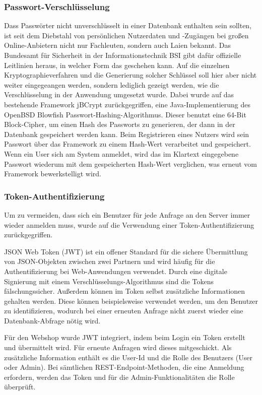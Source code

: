 \subsubsection{Passwort-Verschlüsselung}
Dass Passwörter nicht unverschlüsselt in einer Datenbank enthalten sein sollten, ist seit dem Diebstahl von persönlichen Nutzerdaten und -Zugängen bei großen Online-Anbietern nicht nur Fachleuten, sondern auch Laien bekannt.
Das Bundesamt für Sicherheit in der Informationstechnik \acs{BSI} gibt dafür offizielle Leitlinien heraus, in welcher Form das geschehen kann. \cite{BSI2016}
Auf die einzelnen Kryptographieverfahren und die Generierung solcher Schlüssel soll hier aber nicht weiter eingegeangen werden, sondern lediglich gezeigt werden, wie die Verschlüsselung in der Anwendung umgesetzt wurde.
Dabei wurde auf das bestehende Framework jBCrypt zurückgegriffen, eine Java-Implementierung des OpenBSD Blowfish Passwort-Hashing-Algorithmus. \cite{jBCrypt2015}
Dieser benutzt eine 64-Bit Block-Cipher, um einen Hash des Passworts zu generieren, der dann in der Datenbank gespeichert werden kann. \cite{Provos}
Beim Registrieren eines Nutzers wird sein Passwort über das Framework zu einem Hash-Wert verarbeitet und gespeichert.
Wenn ein User sich am System anmeldet, wird das im Klartext eingegebene Passwort wiederum mit dem gespeicherten Hash-Wert verglichen, was erneut vom Framework bewerkstelligt wird.
\subsubsection{Token-Authentifizierung}
Um zu vermeiden, dass sich ein Benutzer für jede Anfrage an den Server immer wieder anmelden muss, wurde auf die Verwendung einer Token-Authentifizierung zurückgegriffen.

\acs{JSON} Web Token (\acs{JWT}) ist ein offener Standard für die sichere Übermittlung von \acs{JSON}-Objekten zwischen zwei Partnern und wird häufig für die Authentifizierung bei Web-Anwendungen verwendet.
Durch eine digitale Signierung mit einem Verschlüsselungs-Algorithmus sind die Tokens fälschungssicher. Außerdem können im Token selbst zusätzliche Informationen gehalten werden.
Diese können beispielsweise verwendet werden, um den Benutzer zu identifizieren, wodurch bei einer erneuten Anfrage nicht zuerst wieder eine Datenbank-Abfrage nötig wird. \cite{Auth02016}

Für den Webshop wurde \acs{JWT} integriert, indem beim Login ein Token erstellt und übermittelt wird. Für erneute Anfragen wird dieses mitgeschickt. Als zusätzliche Information enthält es die User-Id und die Rolle des Benutzers (User oder Admin).
Bei sämtlichen REST-Endpoint-Methoden, die eine Anmeldung erfordern, werden das Token und für die Admin-Funktionalitäten die Rolle überprüft.
